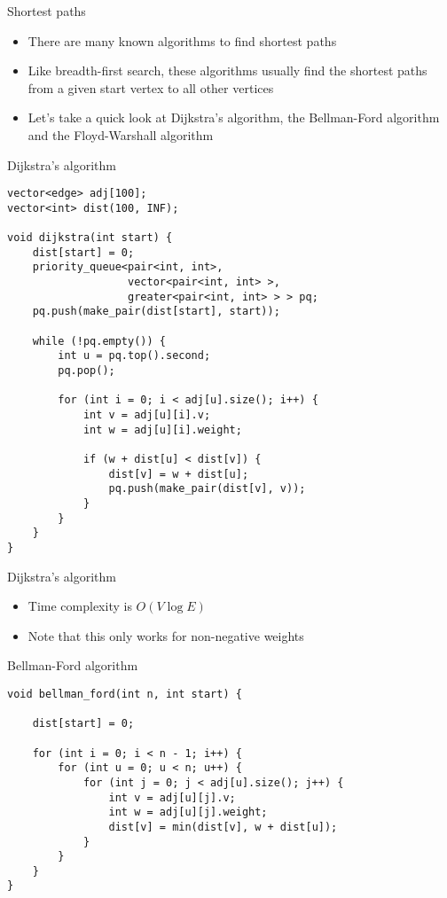 \documentclass[10pt]{beamer}
\newcommand{\bi}{\begin{itemize}}
\newcommand{\ei}{\end{itemize}}
\begin{document}
\begin{frame}{Shortest paths}
    \bi
        \item There are many known algorithms to find shortest paths
        \item Like breadth-first search, these algorithms usually find the shortest paths from a given start vertex to all other vertices
        \vspace{5pt}
        \item Let's take a quick look at Dijkstra's algorithm, the Bellman-Ford algorithm and the Floyd-Warshall algorithm
    \ei
\end{frame}


\begin{frame}[fragile]{Dijkstra's algorithm}
    \begin{verbatim}
vector<edge> adj[100];
vector<int> dist(100, INF);

void dijkstra(int start) {
    dist[start] = 0;
    priority_queue<pair<int, int>,
                   vector<pair<int, int> >,
                   greater<pair<int, int> > > pq;
    pq.push(make_pair(dist[start], start));

    while (!pq.empty()) {
        int u = pq.top().second;
        pq.pop();

        for (int i = 0; i < adj[u].size(); i++) {
            int v = adj[u][i].v;
            int w = adj[u][i].weight;

            if (w + dist[u] < dist[v]) {
                dist[v] = w + dist[u];
                pq.push(make_pair(dist[v], v));
            }
        }
    }
}
    \end{verbatim}
\end{frame}

\begin{frame}{Dijkstra's algorithm}
    \bi
        \item Time complexity is $O(V \log E)$
        \vspace{10pt}
        \item Note that this only works for non-negative weights
    \ei
\end{frame}

\begin{frame}[fragile]{Bellman-Ford algorithm}
    \begin{verbatim}
void bellman_ford(int n, int start) {

    dist[start] = 0;

    for (int i = 0; i < n - 1; i++) {
        for (int u = 0; u < n; u++) {
            for (int j = 0; j < adj[u].size(); j++) {
                int v = adj[u][j].v;
                int w = adj[u][j].weight;
                dist[v] = min(dist[v], w + dist[u]);
            }
        }
    }
}
    \end{verbatim}
\end{frame}
\end{document}
